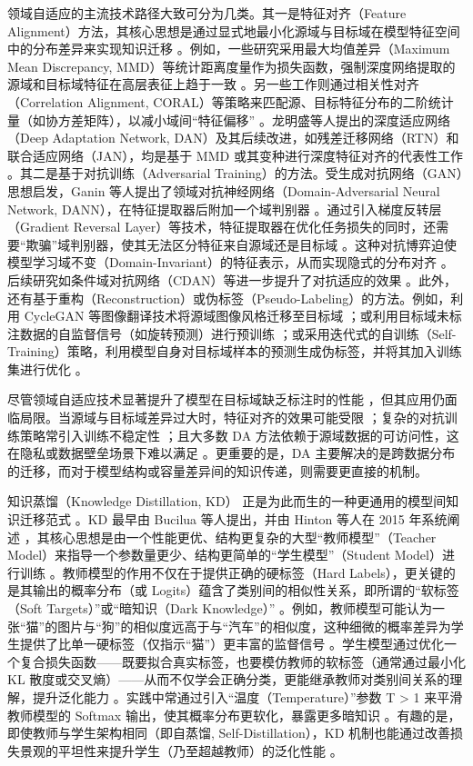 \documentclass[../main.tex]{subfiles}
\begin{document}
领域自适应的主流技术路径大致可分为几类。其一是特征对齐（Feature Alignment）方法，其核心思想是通过显式地最小化源域与目标域在模型特征空间中的分布差异来实现知识迁移 。例如，一些研究采用最大均值差异（Maximum Mean Discrepancy, MMD）等统计距离度量作为损失函数，强制深度网络提取的源域和目标域特征在高层表征上趋于一致 。另一些工作则通过相关性对齐（Correlation Alignment, CORAL）等策略来匹配源、目标特征分布的二阶统计量（如协方差矩阵），以减小域间“特征偏移” 。龙明盛等人提出的深度适应网络（Deep Adaptation Network, DAN）及其后续改进，如残差迁移网络（RTN）和联合适应网络（JAN），均是基于 MMD 或其变种进行深度特征对齐的代表性工作 。其二是基于对抗训练（Adversarial Training）的方法。受生成对抗网络（GAN）思想启发，Ganin 等人提出了领域对抗神经网络（Domain-Adversarial Neural Network, DANN），在特征提取器后附加一个域判别器 。通过引入梯度反转层（Gradient Reversal Layer）等技术，特征提取器在优化任务损失的同时，还需要“欺骗”域判别器，使其无法区分特征来自源域还是目标域 。这种对抗博弈迫使模型学习域不变（Domain-Invariant）的特征表示，从而实现隐式的分布对齐 。后续研究如条件域对抗网络（CDAN）等进一步提升了对抗适应的效果 。此外，还有基于重构（Reconstruction）或伪标签（Pseudo-Labeling）的方法。例如，利用 CycleGAN 等图像翻译技术将源域图像风格迁移至目标域 ；或利用目标域未标注数据的自监督信号（如旋转预测）进行预训练 ；或采用迭代式的自训练（Self-Training）策略，利用模型自身对目标域样本的预测生成伪标签，并将其加入训练集进行优化 。

尽管领域自适应技术显著提升了模型在目标域缺乏标注时的性能 ，但其应用仍面临局限。当源域与目标域差异过大时，特征对齐的效果可能受限 ；复杂的对抗训练策略常引入训练不稳定性 ；且大多数 DA 方法依赖于源域数据的可访问性，这在隐私或数据壁垒场景下难以满足 。更重要的是，DA 主要解决的是跨数据分布的迁移，而对于模型结构或容量差异间的知识传递，则需要更直接的机制。

知识蒸馏（Knowledge Distillation, KD） 正是为此而生的一种更通用的模型间知识迁移范式 。KD 最早由 Bucilua 等人提出，并由 Hinton 等人在 2015 年系统阐述 ，其核心思想是由一个性能更优、结构更复杂的大型“教师模型”（Teacher Model）来指导一个参数量更少、结构更简单的“学生模型”（Student Model）进行训练 。教师模型的作用不仅在于提供正确的硬标签（Hard Labels），更关键的是其输出的概率分布（或 Logits）蕴含了类别间的相似性关系，即所谓的“软标签（Soft Targets）”或“暗知识（Dark Knowledge）” 。例如，教师模型可能认为一张“猫”的图片与“狗”的相似度远高于与“汽车”的相似度，这种细微的概率差异为学生提供了比单一硬标签（仅指示“猫”）更丰富的监督信号 。学生模型通过优化一个复合损失函数——既要拟合真实标签，也要模仿教师的软标签（通常通过最小化 KL 散度或交叉熵）——从而不仅学会正确分类，更能继承教师对类别间关系的理解，提升泛化能力 。实践中常通过引入“温度（Temperature）”参数 T > 1 来平滑教师模型的 Softmax 输出，使其概率分布更软化，暴露更多暗知识 。有趣的是，即使教师与学生架构相同（即自蒸馏, Self-Distillation），KD 机制也能通过改善损失景观的平坦性来提升学生（乃至超越教师）的泛化性能 。
\end{document}
